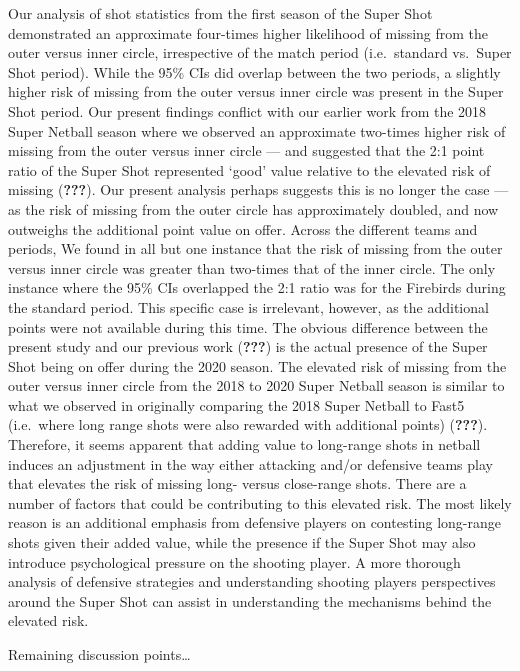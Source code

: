 \documentclass[]{elsarticle} %
\begin{document}
Our analysis of shot statistics from the first season of the Super Shot
demonstrated an approximate four-times higher likelihood of missing from
the outer versus inner circle, irrespective of the match period
(i.e.~standard vs.~Super Shot period). While the 95\% CIs did overlap
between the two periods, a slightly higher risk of missing from the
outer versus inner circle was present in the Super Shot period. Our
present findings conflict with our earlier work from the 2018 Super
Netball season where we observed an approximate two-times higher risk of
missing from the outer versus inner circle --- and suggested that the
2:1 point ratio of the Super Shot represented `good' value relative to
the elevated risk of missing ({\textbf{???}}). Our present analysis
perhaps suggests this is no longer the case --- as the risk of missing
from the outer circle has approximately doubled, and now outweighs the
additional point value on offer. Across the different teams and periods,
We found in all but one instance that the risk of missing from the outer
versus inner circle was greater than two-times that of the inner circle.
The only instance where the 95\% CIs overlapped the 2:1 ratio was for
the Firebirds during the standard period. This specific case is
irrelevant, however, as the additional points were not available during
this time. The obvious difference between the present study and our
previous work ({\textbf{???}}) is the actual presence of the Super Shot
being on offer during the 2020 season. The elevated risk of missing from
the outer versus inner circle from the 2018 to 2020 Super Netball season
is similar to what we observed in originally comparing the 2018 Super
Netball to Fast5 (i.e.~where long range shots were also rewarded with
additional points) ({\textbf{???}}). Therefore, it seems apparent that
adding value to long-range shots in netball induces an adjustment in the
way either attacking and/or defensive teams play that elevates the risk
of missing long- versus close-range shots. There are a number of factors
that could be contributing to this elevated risk. The most likely reason
is an additional emphasis from defensive players on contesting
long-range shots given their added value, while the presence if the
Super Shot may also introduce psychological pressure on the shooting
player. A more thorough analysis of defensive strategies and
understanding shooting players perspectives around the Super Shot can
assist in understanding the mechanisms behind the elevated risk.

Remaining discussion points\ldots{}
\end{document}
